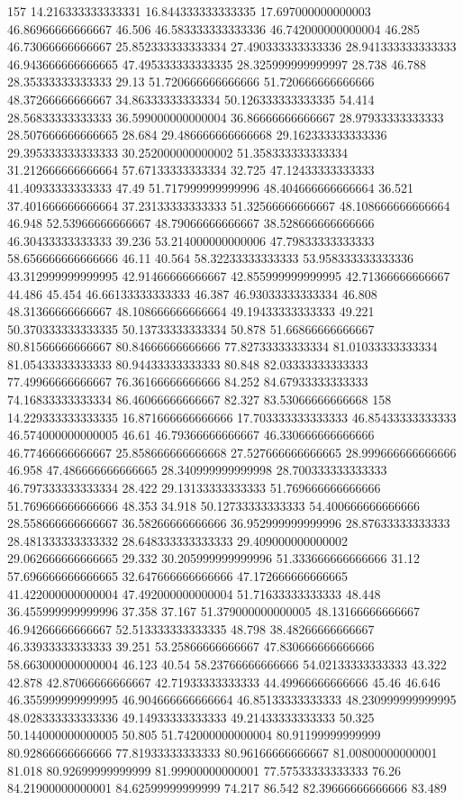 157 14.216333333333331 16.844333333333335 17.697000000000003 46.86966666666667 46.506 46.583333333333336 46.742000000000004 46.285 46.73066666666667 25.852333333333334 27.490333333333336 28.941333333333333 46.943666666666665 47.495333333333335 28.325999999999997 28.738 46.788 28.35333333333333 29.13 51.720666666666666 51.720666666666666 48.37266666666667 34.86333333333334 50.126333333333335 54.414 28.56833333333333 36.599000000000004 36.86666666666667 28.97933333333333 28.507666666666665 28.684 29.486666666666668 29.162333333333336 29.395333333333333 30.252000000000002 51.358333333333334 31.212666666666664 57.67133333333334 32.725 47.12433333333333 41.40933333333333 47.49 51.717999999999996 48.404666666666664 36.521 37.401666666666664 37.23133333333333 51.32566666666667 48.108666666666664 46.948 52.53966666666667 48.79066666666667 38.528666666666666 46.30433333333333 39.236 53.214000000000006 47.79833333333333 58.656666666666666 46.11 40.564 58.32233333333333 53.958333333333336 43.312999999999995 42.91466666666667 42.855999999999995 42.71366666666667 44.486 45.454 46.66133333333333 46.387 46.93033333333334 46.808 48.31366666666667 48.108666666666664 49.19433333333333 49.221 50.370333333333335 50.13733333333334 50.878 51.66866666666667 80.81566666666667 80.84666666666666 77.82733333333334 81.01033333333334 81.05433333333333 80.94433333333333 80.848 82.03333333333333 77.49966666666667 76.36166666666666 84.252 84.67933333333333 74.16833333333334 86.46066666666667 82.327 83.53066666666668
158 14.229333333333335 16.871666666666666 17.703333333333333 46.85433333333333 46.574000000000005 46.61 46.79366666666667 46.330666666666666 46.77466666666667 25.858666666666668 27.527666666666665 28.999666666666666 46.958 47.486666666666665 28.340999999999998 28.700333333333333 46.797333333333334 28.422 29.13133333333333 51.769666666666666 51.769666666666666 48.353 34.918 50.12733333333333 54.400666666666666 28.558666666666667 36.58266666666666 36.952999999999996 28.87633333333333 28.481333333333332 28.648333333333333 29.409000000000002 29.062666666666665 29.332 30.205999999999996 51.333666666666666 31.12 57.696666666666665 32.647666666666666 47.172666666666665 41.422000000000004 47.492000000000004 51.71633333333333 48.448 36.455999999999996 37.358 37.167 51.379000000000005 48.13166666666667 46.94266666666667 52.513333333333335 48.798 38.48266666666667 46.33933333333333 39.251 53.25866666666667 47.830666666666666 58.663000000000004 46.123 40.54 58.23766666666666 54.02133333333333 43.322 42.878 42.87066666666667 42.71933333333333 44.49966666666666 45.46 46.646 46.355999999999995 46.904666666666664 46.85133333333333 48.230999999999995 48.028333333333336 49.14933333333333 49.21433333333333 50.325 50.144000000000005 50.805 51.742000000000004 80.91199999999999 80.92866666666666 77.81933333333333 80.96166666666667 81.00800000000001 81.018 80.92699999999999 81.99900000000001 77.57533333333333 76.26 84.21900000000001 84.62599999999999 74.217 86.542 82.39666666666666 83.489
